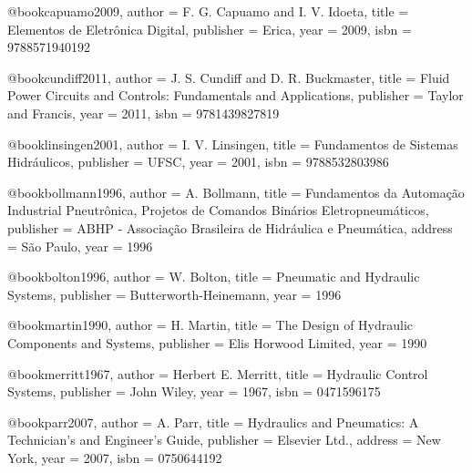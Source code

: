 @book{capuamo2009,
  author = {F. G. Capuamo and I. V. Idoeta},
  title = {Elementos de Eletrônica Digital},
  publisher = {Erica},
  year = {2009},
  isbn = {9788571940192}
}

@book{cundiff2011,
  author = {J. S. Cundiff and D. R. Buckmaster},
  title = {Fluid Power Circuits and Controls: Fundamentals and Applications},
  publisher = {Taylor and Francis},
  year = {2011},
  isbn = {9781439827819}
}

@book{linsingen2001,
  author = {I. V. Linsingen},
  title = {Fundamentos de Sistemas Hidráulicos},
  publisher = {UFSC},
  year = {2001},
  isbn = {9788532803986}
}

@book{bollmann1996,
  author = {A. Bollmann},
  title = {Fundamentos da Automação Industrial Pneutrônica, Projetos de Comandos Binários Eletropneumáticos},
  publisher = {ABHP - Associação Brasileira de Hidráulica e Pneumática},
  address = {São Paulo},
  year = {1996}
}

@book{bolton1996,
  author = {W. Bolton},
  title = {Pneumatic and Hydraulic Systems},
  publisher = {Butterworth-Heinemann},
  year = {1996}
}

@book{martin1990,
  author = {H. Martin},
  title = {The Design of Hydraulic Components and Systems},
  publisher = {Elis Horwood Limited},
  year = {1990}
}

@book{merritt1967,
  author = {Herbert E. Merritt},
  title = {Hydraulic Control Systems},
  publisher = {John Wiley},
  year = {1967},
  isbn = {0471596175}
}

@book{parr2007,
  author = {A. Parr},
  title = {Hydraulics and Pneumatics: A Technician's and Engineer's Guide},
  publisher = {Elsevier Ltd.},
  address = {New York},
  year = {2007},
  isbn = {0750644192}
}

